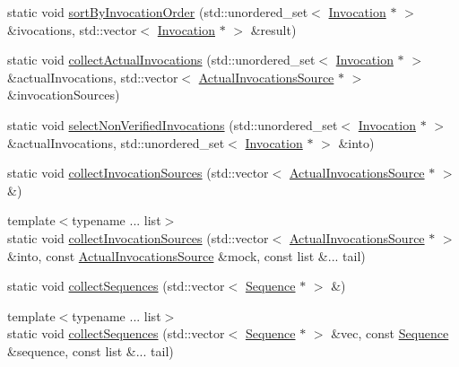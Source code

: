 \begin{DoxyCompactItemize}
static void \mbox{\hyperlink{structfakeit_1_1InvocationUtils_a0badf7e54dd25b44d90b174d6ac39fa3}{sort\+By\+Invocation\+Order}} (std\+::unordered\+\_\+set$<$ \mbox{\hyperlink{structfakeit_1_1Invocation}{Invocation}} $\ast$ $>$ \&ivocations, std\+::vector$<$ \mbox{\hyperlink{structfakeit_1_1Invocation}{Invocation}} $\ast$ $>$ \&result)
\item 
static void \mbox{\hyperlink{structfakeit_1_1InvocationUtils_a0bb553d912e1d41f5fc1cf2d16ae9e55}{collect\+Actual\+Invocations}} (std\+::unordered\+\_\+set$<$ \mbox{\hyperlink{structfakeit_1_1Invocation}{Invocation}} $\ast$ $>$ \&actual\+Invocations, std\+::vector$<$ \mbox{\hyperlink{structfakeit_1_1ActualInvocationsSource}{Actual\+Invocations\+Source}} $\ast$ $>$ \&invocation\+Sources)
\item 
static void \mbox{\hyperlink{structfakeit_1_1InvocationUtils_a333ea33ae42d98d58c0cf5cbb9a1d3cb}{select\+Non\+Verified\+Invocations}} (std\+::unordered\+\_\+set$<$ \mbox{\hyperlink{structfakeit_1_1Invocation}{Invocation}} $\ast$ $>$ \&actual\+Invocations, std\+::unordered\+\_\+set$<$ \mbox{\hyperlink{structfakeit_1_1Invocation}{Invocation}} $\ast$ $>$ \&into)
\item 
static void \mbox{\hyperlink{structfakeit_1_1InvocationUtils_abf6eefccad9f9e43592a11ed5772c2ab}{collect\+Invocation\+Sources}} (std\+::vector$<$ \mbox{\hyperlink{structfakeit_1_1ActualInvocationsSource}{Actual\+Invocations\+Source}} $\ast$ $>$ \&)
\item 
{\footnotesize template$<$typename ... list$>$ }\\static void \mbox{\hyperlink{structfakeit_1_1InvocationUtils_aa88116bb054d94ddc8a3a942f5fc3dd2}{collect\+Invocation\+Sources}} (std\+::vector$<$ \mbox{\hyperlink{structfakeit_1_1ActualInvocationsSource}{Actual\+Invocations\+Source}} $\ast$ $>$ \&into, const \mbox{\hyperlink{structfakeit_1_1ActualInvocationsSource}{Actual\+Invocations\+Source}} \&mock, const list \&... tail)
\item 
static void \mbox{\hyperlink{structfakeit_1_1InvocationUtils_ac2d11afbe797cdd0978cf42a25c4c1a6}{collect\+Sequences}} (std\+::vector$<$ \mbox{\hyperlink{classfakeit_1_1Sequence}{Sequence}} $\ast$ $>$ \&)
\item 
{\footnotesize template$<$typename ... list$>$ }\\static void \mbox{\hyperlink{structfakeit_1_1InvocationUtils_a43b674a2f1109acf4c870e8fb9c2571d}{collect\+Sequences}} (std\+::vector$<$ \mbox{\hyperlink{classfakeit_1_1Sequence}{Sequence}} $\ast$ $>$ \&vec, const \mbox{\hyperlink{classfakeit_1_1Sequence}{Sequence}} \&sequence, const list \&... tail)

\end{DoxyCompactItemize}
